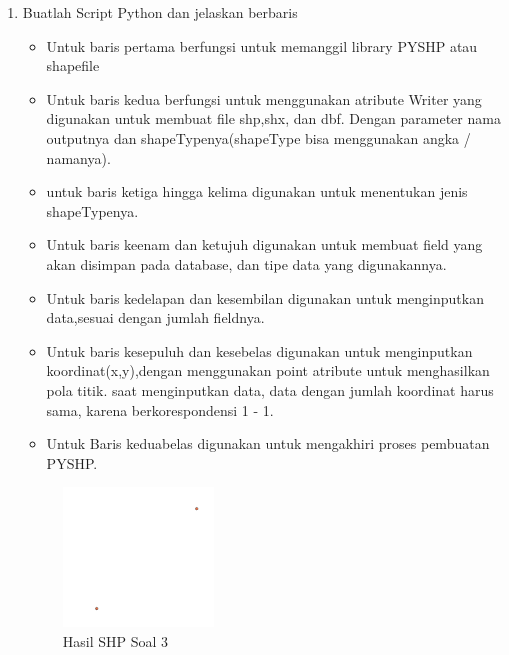 \begin{enumerate}
	\item Buatlah Script Python dan jelaskan berbaris
	
	\begin{itemize}
		\item Untuk baris pertama berfungsi untuk memanggil library PYSHP atau shapefile
		\item Untuk baris kedua berfungsi untuk menggunakan atribute Writer yang digunakan untuk membuat file shp,shx, dan dbf. \hfill\break Dengan parameter nama outputnya dan shapeTypenya(shapeType bisa menggunakan angka / namanya).
		\item untuk baris ketiga hingga kelima digunakan untuk menentukan jenis shapeTypenya.
		\item Untuk baris keenam dan ketujuh digunakan untuk membuat field yang akan disimpan pada database, dan tipe data yang digunakannya.
		\item Untuk baris kedelapan dan kesembilan digunakan untuk menginputkan data,sesuai dengan jumlah fieldnya.
		\item Untuk baris kesepuluh dan kesebelas digunakan untuk menginputkan koordinat(x,y),dengan menggunakan point atribute untuk menghasilkan pola titik. \hfill\break
		saat menginputkan data, data dengan jumlah koordinat harus sama, karena berkorespondensi 1 - 1.
		\item Untuk Baris keduabelas digunakan untuk mengakhiri proses pembuatan PYSHP.
	\end{itemize}
	\hfill\break
	\begin{figure}[H]
		\includegraphics[width=4cm]{figures/1174027/2/soal3.png}
		\centering
		\caption{Hasil SHP Soal 3}
	\end{figure}


\end{enumerate}
